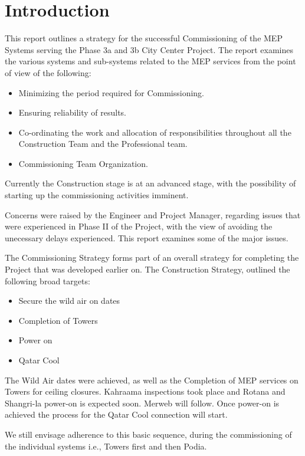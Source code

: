 
\chapter{Introduction}

This report outlines a strategy for the successful Commissioning of the MEP Systems serving the Phase 3a and 3b City Center Project. The report examines the various systems and sub-systems related to the MEP services from the point of view of the following:

\begin{itemize}
\item Minimizing the period required for Commissioning.
\item Ensuring reliability of results.
\item Co-ordinating the work and allocation of responsibilities throughout all the Construction Team and the Professional team.
\item Commissioning Team Organization.
\end{itemize}

Currently  the Construction stage is at an advanced stage, with the possibility of starting up the commissioning activities imminent.

Concerns were raised by the Engineer and Project Manager, regarding issues that were experienced in Phase II of the Project, with the view of avoiding the unecessary delays experienced. This report examines some of the major issues.

The Commissioning Strategy forms part of an overall strategy for completing the Project that was developed earlier on. The Construction Strategy, outlined the following broad targets:

\begin{itemize}
\item Secure the wild air on dates
\item Completion of Towers
\item Power on
\item Qatar Cool
\end{itemize}

The Wild Air dates were achieved, as well as the Completion of MEP services on Towers for ceiling closures. Kahraama inspections took place and Rotana and Shangri-la power-on is expected soon. Merweb will follow. Once power-on is achieved the process for the Qatar Cool connection will start.


We still envisage adherence to this basic sequence, during the commissioning of the individual systems i.e., Towers first and then Podia.

